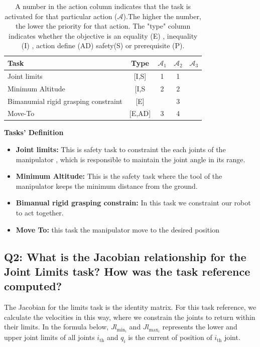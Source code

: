 \documentclass{article}
\begin{document}
\begin{table}[htb]
	\label{tbl:actions_tables}
	\begin{center}
		\footnotesize
		\begin{tabular}{lcccc}
			\toprule		
			Task & Type & $\mathcal{A}_{1}$ & $\mathcal{A}_{2}$  & $\mathcal{A}_{3}$  \\
			\midrule
			Joint limits                      & [I,S] & 1 & 1 &  \\
			\hdashline
			Minimum Altitude						& [I,S & 2& 2 & \\
			\hdashline 
			Bimanumial rigid grasping constraint					& [E] & & 3 & \\
			\hdashline
			Move-To						& [E,AD] & 3 & 4& \\ 
			
			\bottomrule
		\end{tabular}
	\end{center}
\caption{A number in the action column indicates that the task is activated for that particular action ($\mathcal{A}$).The higher the number, the lower the priority for that action. The "type" column indicates whether the objective is an equality (E) , inequality (I) , action define (AD) safety(S) or prerequisite (P).}
\end{table}
\noindent
\textbf{Tasks' Definition}
\begin{itemize}
	\item \textbf{Joint limits:} This is safety task to constraint the each joints of the manipulator , which is responsible to maintain the joint angle in its range.
	\item \textbf{Minimum Altitude:} This is the safety task where the tool of the manipulator keeps the minimum distance from the ground. 
	\item \textbf{Bimanual rigid grasping constrain:} In this task we constraint our robot to act together. 
	\item \textbf{Move To:} this task the manipulator move to the desired position 
\end{itemize}

\subsection{Q2: What is the Jacobian relationship for the Joint Limits task? How was the task reference computed?}
The Jacobian for the limits task is the identity matrix. For this task reference, we calculate the velocities in this way, where we constrain the joints to return within their limits. In the formula below,  $Jl_{\text{min}_i}$ and $Jl_{\text{max}_i}$  represents the lower and upper joint limits of all joints  $i_{\text{th}}$ and $q_i$ is the current of position of $i_{\text{th}}$ joint.
\end{document}

